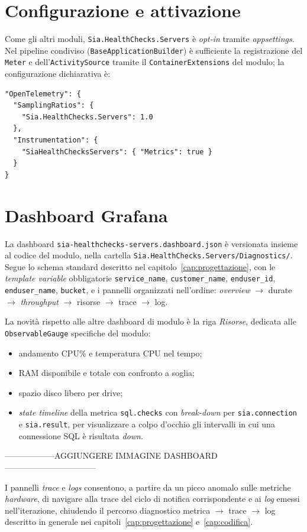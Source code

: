 \section{Configurazione e attivazione}

Come gli altri moduli, \texttt{Sia.HealthChecks.Servers} è \emph{opt-in} tramite
\emph{appsettings}. Nel pipeline condiviso (\texttt{BaseApplicationBuilder}) è sufficiente
la registrazione del \texttt{Meter} e dell'\texttt{ActivitySource} tramite il
\texttt{ContainerExtensions} del modulo; la configurazione dichiarativa è:

\begin{verbatim}
"OpenTelemetry": {
  "SamplingRatios": {
    "Sia.HealthChecks.Servers": 1.0
  },
  "Instrumentation": {
    "SiaHealthChecksServers": { "Metrics": true }
  }
}
\end{verbatim}

\section{Dashboard Grafana}

La dashboard \texttt{sia-healthchecks-servers.dashboard.json} è versionata insieme al codice
del modulo, nella cartella \texttt{Sia.HealthChecks.Servers/Diagnostics/}. Segue lo schema
standard descritto nel capitolo~\ref{cap:progettazione}, con le \emph{template variable}
obbligatorie \texttt{service\_name}, \texttt{customer\_name}, \texttt{enduser\_id},
\texttt{enduser\_name}, \texttt{bucket}, e i pannelli organizzati nell'ordine:
\emph{overview} $\rightarrow$ durate $\rightarrow$ \emph{throughput} $\rightarrow$ risorse $\rightarrow$ trace $\rightarrow$
log.

La novità rispetto alle altre dashboard di modulo è la riga \emph{Risorse}, dedicata alle
\texttt{ObservableGauge} specifiche del modulo:
\begin{itemize}
    \item andamento CPU\% e temperatura CPU nel tempo;
    \item RAM disponibile e totale con confronto a soglia;
    \item spazio disco libero per drive;
    \item \emph{state timeline} della metrica \texttt{sql.checks} con \emph{break-down} per
        \texttt{sia.connection} e \texttt{sia.result}, per visualizzare a colpo d'occhio gli
        intervalli in cui una connessione SQL è risultata \emph{down}.
\end{itemize}

------------------AGGIUNGERE IMMAGINE DASHBOARD ---------------------------------

I pannelli \emph{trace} e \emph{logs} consentono, a partire da un picco anomalo sulle
metriche \emph{hardware}, di navigare alla trace del ciclo di notifica corrispondente
e ai \emph{log} emessi nell'iterazione, chiudendo il percorso diagnostico
metrica $\rightarrow$ trace $\rightarrow$ log descritto in generale nei
capitoli~\ref{cap:progettazione} e~\ref{cap:codifica}.
